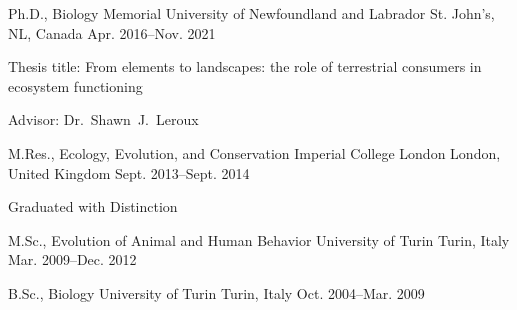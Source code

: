 

\begin{cventries}

   \cventry
    {Ph.D., Biology} %
    {Memorial University of Newfoundland and Labrador} %
    {St. John's, NL, Canada} %
    {Apr. 2016--Nov. 2021} %
    {
      \begin{cvitems} %
        \item {Thesis title: From elements to landscapes: the role of terrestrial consumers in ecosystem functioning}
        \item {Advisor: Dr.~Shawn~J.~Leroux}
      \end{cvitems}
    }

  \cventry
    {M.Res., Ecology, Evolution, and Conservation} %
    {Imperial College London} %
    {London, United Kingdom} %
    {Sept. 2013--Sept. 2014} %
    {
      \begin{cvitems} %
        \item {Graduated with Distinction}
      \end{cvitems}
    }
  
  \cventry
    {M.Sc., Evolution of Animal and Human Behavior} %
    {University of Turin} %
    {Turin, Italy} %
    {Mar. 2009--Dec. 2012} %
    {}
  
  \cventry
    {B.Sc., Biology} %
    {University of Turin} %
    {Turin, Italy} %
    {Oct. 2004--Mar. 2009} %
    {}
\end{cventries}
